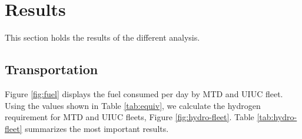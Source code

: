 \documentclass[11pt,letterpaper]{article}
\begin{document}
\section{Results}
\label{sec:Results}

This section holds the results of the different analysis.

\subsection{Transportation}

Figure \ref{fig:fuel} displays the fuel consumed per day by \gls{MTD} and \gls{UIUC} fleet.
Using the values shown in Table \ref{tab:equiv}, we calculate the hydrogen requirement for MTD and UIUC fleets, Figure \ref{fig:hydro-fleet}.
Table \ref{tab:hydro-fleet} summarizes the most important results.
\end{document}
